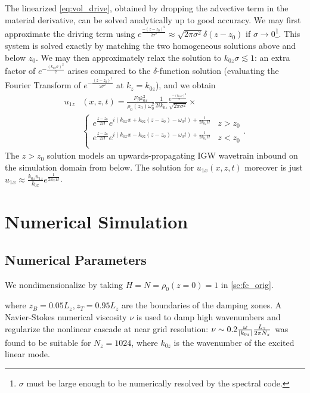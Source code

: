 \documentclass[twocolumn,
        nofootinbib, %
        usenames, %
        aps,
        prd,
        dvipsnames %
    ]{revtex4-1}%
\DeclarePairedDelimiter\abs{\lvert}{\rvert}
\begin{document}
The linearized \autoref{eq:vol_drive}, obtained by dropping the advective term
in the material derivative, can be solved analytically up to good accuracy. We
may first approximate the driving term using $e^{\frac{-(z - z_0)^2}{2\sigma^2}}
\approx \sqrt{2\pi \sigma^2}\delta(z - z_0)$ if $\sigma \to 0$\footnote{$\sigma$
must be large enough to be numerically resolved by the spectral code.}. This
system is solved exactly by matching the two homogeneous solutions above and
below $z_0$. We may then approximately relax the solution to $k_{0z}\sigma
\lesssim 1$: an extra factor of $e^{-\frac{(k_{0z}\sigma)^2}{2}}$ arises
compared to the $\delta$-function solution (evaluating the Fourier Transform
of $e^{-\frac{(z - z_0)^2}{2\sigma^2}}$ at $k_z = k_{0z}$), and we obtain
\begin{align}
    u_{1z}&(x, z, t) ={} \frac{Fgk_{0x}^2}{\rho_0(z_0)\omega_0^2}
        \frac{1}{2ik_{0z}}\frac{e^{\frac{-(k_{0z}\sigma)^2}{2}}}
        {\sqrt{2\pi\sigma^2}} \times\nonumber\\
        &{}\begin{cases}
        e^{\frac{z - z_0}{2H}}e^{i(k_{0x}x + k_{0z}(z - z_0) - \omega_0 t)
            + \frac{1}{2k_{0z}H}}
            & z > z_0\\
        e^{\frac{z - z_0}{2H}}e^{i(k_{0x}x - k_{0z}(z - z_0) - \omega_0 t)
            + \frac{1}{2k_{0z}H}}
            & z < z_0\\
    \end{cases}.\label{eq:uz_lin}
\end{align}
The $z > z_0$ solution models an upwards-propagating IGW wavetrain inbound on
the simulation domain from below. The solution for $u_{1x}(x, z, t)$ moreover is
just $u_{1x} \approx \frac{k_{0z} u_{1z}}{k_{0x}}e^{\frac{1}{2k_{0z}H}}$.

\section{Numerical Simulation}

\subsection{Numerical Parameters}\label{ss:numerics}

We nondimensionalize by taking $H = N = \rho_0(z=0) = 1$ in
\autoref{se:fc_orig}.

where $z_B = 0.05L_z, z_T = 0.95L_z$ are the boundaries of the damping zones. A
Navier-Stokes numerical viscosity $\nu$ is used to damp high wavenumbers and
regularize the nonlinear cascade at near grid resolution: $\nu \sim 0.2
\frac{\omega}{\abs*{k_{0z}}}\frac{L_z}{2\pi N_z}$ was found to be suitable for
$N_z = 1024$, where $k_{0z}$ is the wavenumber of the excited linear mode.
\end{document}
